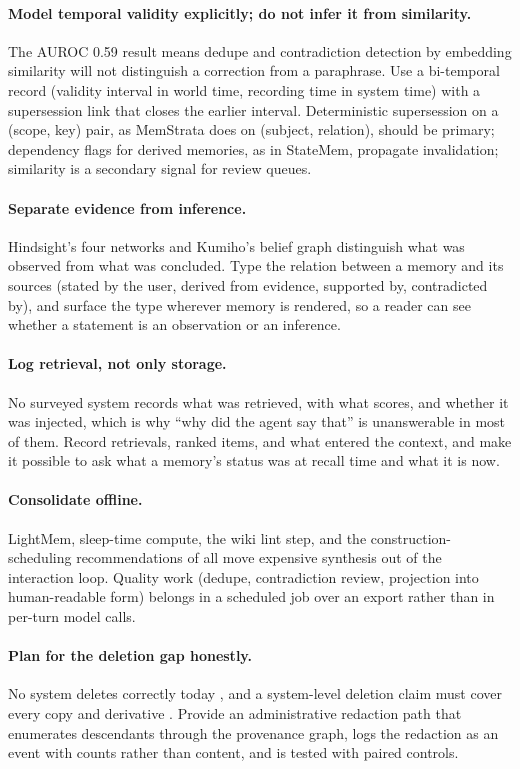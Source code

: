 \documentclass[11pt]{article}
\begin{document}
\paragraph{Model temporal validity explicitly; do not infer it from similarity.} The AUROC 0.59 result means dedupe and contradiction detection by embedding similarity will not distinguish a correction from a paraphrase. Use a bi-temporal record (validity interval in world time, recording time in system time) with a supersession link that closes the earlier interval. Deterministic supersession on a (scope, key) pair, as MemStrata does on (subject, relation), should be primary; dependency flags for derived memories, as in StateMem, propagate invalidation; similarity is a secondary signal for review queues.

\paragraph{Separate evidence from inference.} Hindsight's four networks and Kumiho's belief graph distinguish what was observed from what was concluded. Type the relation between a memory and its sources (stated by the user, derived from evidence, supported by, contradicted by), and surface the type wherever memory is rendered, so a reader can see whether a statement is an observation or an inference.

\paragraph{Log retrieval, not only storage.} No surveyed system records what was retrieved, with what scores, and whether it was injected, which is why ``why did the agent say that'' is unanswerable in most of them. Record retrievals, ranked items, and what entered the context, and make it possible to ask what a memory's status was at recall time and what it is now.

\paragraph{Consolidate offline.} LightMem, sleep-time compute, the wiki lint step, and the construction-scheduling recommendations of \citet{omri2026systems} all move expensive synthesis out of the interaction loop. Quality work (dedupe, contradiction review, projection into human-readable form) belongs in a scheduled job over an export rather than in per-turn model calls.

\paragraph{Plan for the deletion gap honestly.} No system deletes correctly today \citep{xie2026bemula}, and a system-level deletion claim must cover every copy and derivative \citep{xu2026unlearningsurvey}. Provide an administrative redaction path that enumerates descendants through the provenance graph, logs the redaction as an event with counts rather than content, and is tested with paired controls.
\end{document}
